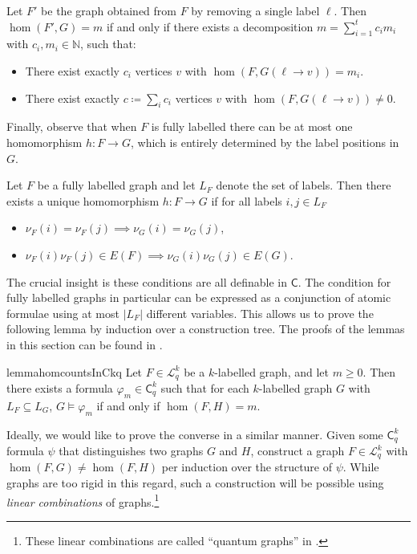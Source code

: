 \documentclass[a4paper,UKenglish,cleveref, autoref, thm-restate]{lipics-v2021}
\renewcommand{\phi}{\varphi}
\newcommand{\N}{\ensuremath{\mathbb{N}}}
\newcommand{\Lkq}{\ensuremath{\mathcal{L}_{q}^{k}}}
\newcommand{\lC} {\ensuremath{\mathsf C}}
\begin{document}
\begin{observation}\label{prp:homlabeldel}
  Let $F'$ be the graph obtained from $F$ by removing a single label $\ell$. Then $\hom(F', G) = m$ if and only if there exists a decomposition $m = \sum_{i=1}^tc_im_i$ with $c_i, m_i \in \N$, such that:
  \begin{itemize}
  \item There exist exactly $c_i$ vertices $v$ with $\hom(F, G(\ell \rightarrow v)) = m_i$.
    \item There exist exactly $c \coloneqq \sum_i c_i$ vertices $v$ with $\hom(F, G(\ell \rightarrow v)) \neq 0$.
  \end{itemize}
\end{observation}

Finally, observe that when $F$ is fully labelled there can be at most one homomorphism $h \colon F \to G$, which is entirely determined by the label positions in $G$.

\begin{observation}
  Let $F$ be a fully labelled graph and let $L_F$ denote the set of labels. Then there exists a unique homomorphism $h \colon F \to G$ if for all labels $i, j \in L_F$
  \begin{itemize}
  \item $\nu_F(i) = \nu_F(j) \implies \nu_G(i) = \nu_G(j)$,
  \item $\nu_F(i)\nu_F(j) \in E(F) \implies \nu_G(i)\nu_G(j) \in E(G)$.
  \end{itemize}
\end{observation}

The crucial insight is these conditions are all definable in $\lC$. The condition for fully labelled graphs in particular can be expressed as a conjunction of atomic formulae using at most $|L_F|$ different variables. This allows us to prove the following lemma by induction over a construction tree.
The proofs of the lemmas in this section can be found in .

\begin{restatable}{lemma}{homcountsInCkq}
  \label{lem:homcounts_in_ckq}
  Let $F \in \Lkq$ be a $k$-labelled graph, and let $m \geq 0$. Then there exists a formula $\phi_m \in \lC^k_q$ such that for each $k$-labelled graph $G$ with $L_F \subseteq L_G$, $G \models \phi_m$ if and only if $\hom(F, H) = m$.
\end{restatable}

Ideally, we would like to prove the converse in a similar manner. Given some $\lC^k_q$ formula $\psi$ that distinguishes two graphs $G$ and $H$, construct a graph $F \in \Lkq$ with $\hom(F, G) \neq \hom(F, H)$ per induction over the structure of $\psi$. While graphs are too rigid in this regard, such a construction will be possible using \emph{linear combinations} of graphs.\footnote{These linear combinations are called ``quantum graphs'' in \cite{dvorak_recognizing_2010}.}
\end{document}
